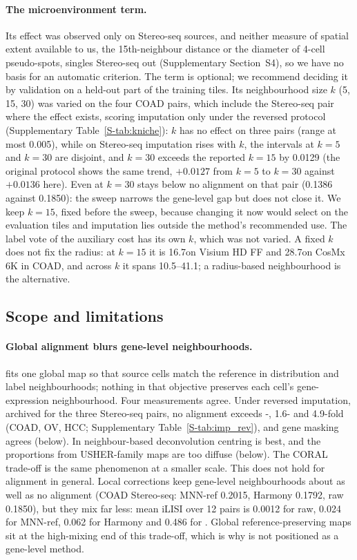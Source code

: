\paragraph{The microenvironment term.}
Its effect was observed only on Stereo-seq sources, and neither measure of spatial extent available to us, the
15th-neighbour distance or the diameter of 4-cell pseudo-spots, singles Stereo-seq out (Supplementary Section~S4), so
we have no basis for an automatic criterion. The
term is optional; we recommend deciding it by validation on a held-out part of the training tiles. Its neighbourhood
size $k$ (5, 15, 30) was varied on the four COAD pairs, which include the Stereo-seq pair where the effect exists,
scoring imputation only under the reversed protocol (Supplementary Table~\ref{S-tab:kniche}): $k$ has no
effect on three pairs (range at most 0.005), while on Stereo-seq imputation rises with $k$, the intervals at $k=5$ and
$k=30$ are disjoint, and $k=30$ exceeds the reported $k=15$ by 0.0129 (the original protocol shows the same trend,
$+0.0127$ from $k=5$ to $k=30$ against $+0.0136$ here). Even at $k=30$ \frost stays below no alignment on that pair
(0.1386 against 0.1850): the sweep narrows the gene-level gap but does not close it. We keep $k=15$, fixed before the
sweep, because changing it now would select on the evaluation tiles and imputation lies outside the method's
recommended use. The label vote of the auxiliary cost has its own $k$, which was not varied. A fixed $k$ does not fix
the radius: at $k=15$ it is 16.7\um on Visium HD FF and 28.7\um on CosMx 6K in COAD, and across $k$ it spans
10.5--41.1\um; a radius-based neighbourhood is the alternative.

\subsection{Scope and limitations}\label{sec:limitations}

\paragraph{Global alignment blurs gene-level neighbourhoods.}
\frost fits one global map so that source cells match the reference in distribution and label neighbourhoods; nothing
in that objective preserves each cell's gene-expression neighbourhood. Four measurements agree. Under
reversed imputation, archived for the three Stereo-seq pairs, no alignment exceeds -, 1.6- and
4.9-fold (COAD, OV, HCC; Supplementary Table~\ref{S-tab:imp_rev}), and gene masking agrees (below). In neighbour-based deconvolution centring is best, and the
proportions from USHER-family maps are too diffuse (below). The CORAL trade-off is the same phenomenon at a smaller
scale. This does not hold for alignment in general. Local corrections keep gene-level neighbourhoods about as well as
no alignment (COAD Stereo-seq: MNN-ref 0.2015, Harmony 0.1792, raw 0.1850), but they mix far less: mean iLISI over
12 pairs is 0.0012 for raw, 0.024 for MNN-ref, 0.062 for Harmony and 0.486 for \frost. Global reference-preserving
maps sit at the high-mixing end of this trade-off, which is why \frost is not positioned as a gene-level method.

